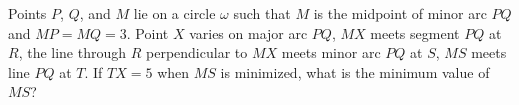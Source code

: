 Points $P$, $Q$, and $M$ lie on a circle $\omega$ such that $M$ is the midpoint of minor arc $PQ$ and $MP=MQ=3$. Point $X$ varies on major arc $PQ$, $MX$ meets segment $PQ$ at $R$, the line through $R$ perpendicular to $MX$ meets minor arc $PQ$ at $S$, $MS$ meets line $PQ$ at $T$. If $TX=5$ when $MS$ is minimized, what is the minimum value of $MS$?
